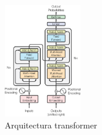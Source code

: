 \begin{figure}
	\centering
	\includegraphics[width = 0.3\textwidth]{Imagenes/Vectorial/Transformer.pdf}
	\caption{Arquitectura transformer}%
	\label{fig:Transformer Architecture}
\end{figure}

